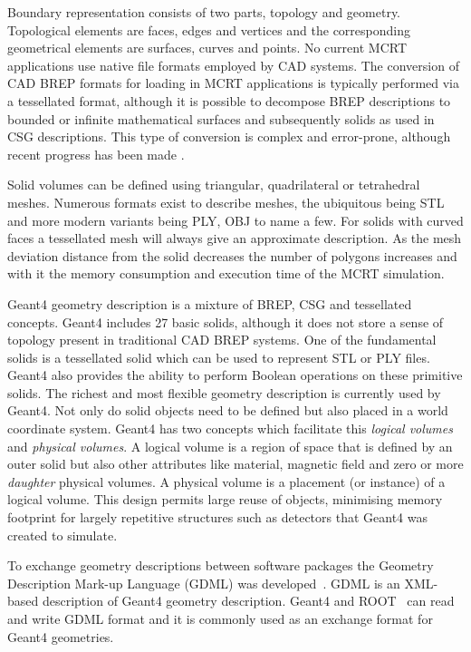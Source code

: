 \documentclass[final,5p,times,twocolumn]{elsarticle}
\begin{document}
Boundary representation consists of two parts, topology and geometry. Topological elements are faces, edges and vertices and the corresponding
geometrical elements are surfaces, curves and points. No current MCRT applications use native file formats employed by CAD systems. The conversion of 
CAD BREP formats for loading in MCRT applications is typically performed via a tessellated format, although it is possible to decompose BREP descriptions
 to bounded or infinite mathematical surfaces and subsequently solids as used in CSG descriptions. This type of conversion is complex and error-prone, 
 although recent progress has been made \cite{WangNuclSciTech31-82-2020}.

Solid volumes can be defined using triangular, quadrilateral or tetrahedral meshes. Numerous formats exist to describe meshes, the ubiquitous being STL and 
more modern variants being PLY, OBJ to name a few. For solids with curved faces a tessellated mesh will always give an approximate description. As the mesh 
deviation distance from the solid decreases the number of polygons increases and with it the memory consumption and execution time of the MCRT simulation. 

Geant4 geometry description is a mixture of BREP, CSG and tessellated concepts. Geant4 includes 27 basic solids, although it does not store a sense 
of topology present in traditional CAD BREP systems. One of the fundamental solids is a tessellated solid which can be used to represent STL or PLY files. 
Geant4 also provides the ability to perform Boolean operations on these primitive solids. The richest and most flexible geometry description is currently used by
Geant4. Not only do solid objects need to be defined but also placed in a world coordinate system. Geant4 has two concepts which facilitate this \emph{logical volumes}
and \emph{physical volumes}. A logical volume is a region of space that is defined by an outer solid but also other attributes like material, magnetic field 
and zero or more \emph{daughter} physical volumes. A physical volume is a placement (or instance) of a logical volume. This design permits large reuse 
of objects, minimising memory footprint for largely repetitive structures such as detectors that Geant4 was created to simulate.  


To exchange geometry descriptions between software packages the Geometry Description Mark-up Language (GDML) was developed~\cite{GDML}. 
GDML is an XML-based description of Geant4 geometry description. Geant4 and ROOT~\cite{fons_rademakers_2019_3895860} can read and write 
GDML format and it is commonly used as an exchange format for Geant4 geometries. 
\end{document}
